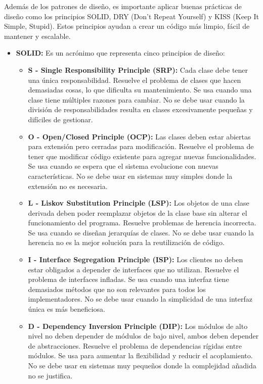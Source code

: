 Además de los patrones de diseño, es importante aplicar buenas prácticas de diseño como los principios SOLID, DRY (Don't Repeat Yourself) y KISS (Keep It Simple, Stupid). Estos principios ayudan a crear un código más limpio, fácil de mantener y escalable.

\begin{itemize}
    \item \textbf{SOLID:} Es un acrónimo que representa cinco principios de diseño:
        \begin{itemize}
            \item \textbf{S - Single Responsibility Principle (SRP):} Cada clase debe tener una única responsabilidad. Resuelve el problema de clases que hacen demasiadas cosas, lo que dificulta su mantenimiento. Se usa cuando una clase tiene múltiples razones para cambiar. No se debe usar cuando la división de responsabilidades resulta en clases excesivamente pequeñas y difíciles de gestionar.
            \item \textbf{O - Open/Closed Principle (OCP):} Las clases deben estar abiertas para extensión pero cerradas para modificación. Resuelve el problema de tener que modificar código existente para agregar nuevas funcionalidades. Se usa cuando se espera que el sistema evolucione con nuevas características. No se debe usar en sistemas muy simples donde la extensión no es necesaria.
            \item \textbf{L - Liskov Substitution Principle (LSP):} Los objetos de una clase derivada deben poder reemplazar objetos de la clase base sin alterar el funcionamiento del programa. Resuelve problemas de herencia incorrecta. Se usa cuando se diseñan jerarquías de clases. No se debe usar cuando la herencia no es la mejor solución para la reutilización de código.
            \item \textbf{I - Interface Segregation Principle (ISP):} Los clientes no deben estar obligados a depender de interfaces que no utilizan. Resuelve el problema de interfaces infladas. Se usa cuando una interfaz tiene demasiados métodos que no son relevantes para todos los implementadores. No se debe usar cuando la simplicidad de una interfaz única es más beneficiosa.
            \item \textbf{D - Dependency Inversion Principle (DIP):} Los módulos de alto nivel no deben depender de módulos de bajo nivel, ambos deben depender de abstracciones. Resuelve el problema de dependencias rígidas entre módulos. Se usa para aumentar la flexibilidad y reducir el acoplamiento. No se debe usar en sistemas muy pequeños donde la complejidad añadida no se justifica.

\end{itemize}
\end{itemize}
